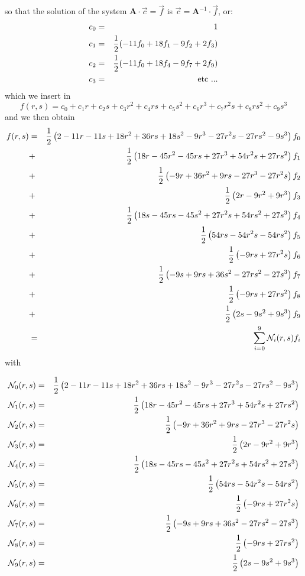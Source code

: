 so that the solution of the system ${\bm A}\cdot \vec{c}=\vec{f}$ is
$\vec{c} = {\bm A}^{-1}\cdot \vec{f}$, or:
\begin{eqnarray}
c_0 &=& 1   \nonumber\\
c_1 &=& \frac12 (-11 f_0 + 18 f_1 -9 f_2 + 2f_3 ) \nonumber\\
c_2 &=& \frac12 (-11f_0 + 18f_4 -9 f_7 + 2f_9) \nonumber\\
c_3 &=& \text{etc ...}
\end{eqnarray}
which we insert in 
\[
f(r,s) = c_0 + c_1 r+ c_2 s + c_3r^2 + c_4 rs + c_5 s^2
+c_6 r^3 + c_7 r^2s + c_8 rs^2 + c_9 s^3
\]
and we then obtain
\begin{eqnarray}
f(r,s) 
&=&\frac12\left(2-11r-11s+18r^2+36rs+18s^2-9r^3-27r^2s-27rs^2-9s^3 \right) f_0 \nonumber\\
&+&\frac12\left(18r-45r^2-45rs +27r^3 +54r^2s+27rs^2\right) f_1\nonumber\\
&+&\frac12\left( -9r+36r^2+9rs -27r^3 -27r^2s \right) f_2\nonumber\\
&+&\frac12\left( 2r-9r^2+9r^3 \right) f_3\nonumber\\
&+&\frac12\left( 18s -45rs-45s^2+27r^2s+54rs^2+27s^3\right) f_4\nonumber\\
&+&\frac12\left( 54rs-54r^2s-54rs^2  \right) f_5\nonumber\\
&+&\frac12\left( -9rs+27r^2s  \right) f_6\nonumber\\
&+&\frac12\left( -9s+9rs+36s^2-27rs^2-27s^3  \right) f_7\nonumber\\
&+&\frac12\left( -9rs+27rs^2  \right) f_8\nonumber\\
&+&\frac12\left( 2s-9s^2+9s^3  \right) f_9 \nonumber \\
&=& \sum_{i=0}^9 {\mathcal{N}}_i(r,s) f_i \nonumber
\end{eqnarray}
with
\begin{mdframed}[backgroundcolor=blue!5]
\begin{eqnarray}
{\mathcal{N}}_0(r,s) &=& \frac12\left(2-11r-11s+18r^2+36rs+18s^2-9r^3-27r^2s-27rs^2-9s^3 \right)   \nonumber\\
{\mathcal{N}}_1(r,s)&=& \frac12\left(18r-45r^2-45rs +27r^3 +54r^2s+27rs^2\right)   \nonumber\\
{\mathcal{N}}_2(r,s)&=& \frac12\left( -9r+36r^2+9rs -27r^3 -27r^2s \right)   \nonumber\\
{\mathcal{N}}_3(r,s)&=& \frac12\left( 2r-9r^2+9r^3 \right)   \nonumber\\
{\mathcal{N}}_4(r,s)&=& \frac12\left( 18s -45rs-45s^2+27r^2s+54rs^2+27s^3\right) \nonumber\\
{\mathcal{N}}_5(r,s)&=& \frac12\left( 54rs-54r^2s-54rs^2  \right)   \nonumber\\
{\mathcal{N}}_6(r,s)&=& \frac12\left( -9rs+27r^2s  \right)   \nonumber\\
{\mathcal{N}}_7(r,s)&=& \frac12\left( -9s+9rs+36s^2-27rs^2-27s^3\right)\nonumber\\
{\mathcal{N}}_8(r,s)&=& \frac12\left( -9rs+27rs^2  \right)   \nonumber\\
{\mathcal{N}}_9(r,s)&=& \frac12\left( 2s-9s^2+9s^3  \right)   
\end{eqnarray}
\end{mdframed}

